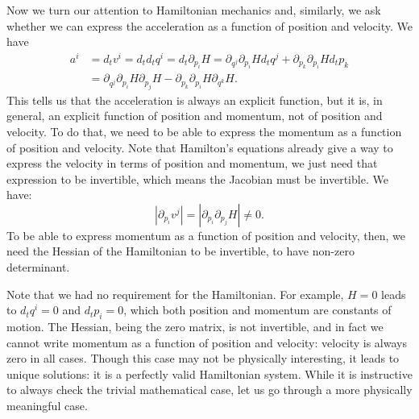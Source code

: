 Now we turn our attention to Hamiltonian mechanics and, similarly, we ask whether we can express the acceleration as a function of position and velocity. We have
\begin{equation}
	\begin{aligned}
		a^i &= d_t v^i = d_t d_t q^i = d_t \partial_{p_i} H = \partial_{q^j} \partial_{p_i} H d_t q^j + \partial_{p_k} \partial_{p_i} H d_t p_k \\
		&= \partial_{q^j} \partial_{p_i} H \partial_{p_j} H - \partial_{p_k} \partial_{p_i} H \partial_{q^k} H.
	\end{aligned}
\end{equation}
This tells us that the acceleration is always an explicit function, but it is, in general, an explicit function of position and momentum, not of position and velocity. To do that, we need to be able to express the momentum as a function of position and velocity. Note that Hamilton's equations already give a way to express the velocity in terms of position and momentum, we just need that expression to be invertible, which means the Jacobian must be invertible. We have:
\begin{equation}
	\left|\partial_{p_i} v^j\right| = \left|\partial_{p_i}\partial_{p_j} H\right| \neq 0 .
\end{equation}
To be able to express momentum as a function of position and velocity, then, we need the Hessian of the Hamiltonian to be invertible, to have non-zero determinant.

Note that we had no requirement for the Hamiltonian. For example, $H=0$ leads to $d_t q^i = 0$ and $d_t p_i = 0$, which both position and momentum are constants of motion. The Hessian, being the zero matrix, is not invertible, and in fact we cannot write momentum as a function of position and velocity: velocity is always zero in all cases. Though this case may not be physically interesting, it leads to unique solutions: it is a perfectly valid Hamiltonian system. While it is instructive to always check the trivial mathematical case, let us go through a more physically meaningful case.

